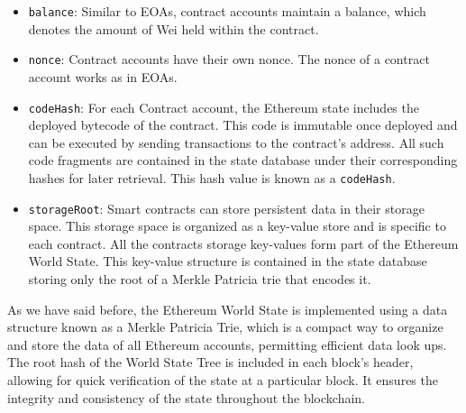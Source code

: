 \begin{itemize}

\item \texttt{balance}: Similar to EOAs, contract accounts maintain a balance, which denotes the amount of Wei held within the contract.

\item \texttt{nonce}: Contract accounts have their own nonce. The nonce of a contract account works as in EOAs.

\item \texttt{codeHash}: For each Contract account, the Ethereum state includes the deployed bytecode of the contract. This code is immutable once deployed and can be executed by sending transactions to the contract's address. All such code fragments are contained in the state database under their corresponding hashes for later retrieval. This hash value is known as a \texttt{codeHash}.

\item \texttt{storageRoot}: Smart contracts can store persistent data in their storage space. This storage space is organized as a key-value store and is specific to each contract. All the contracts storage key-values form part of the Ethereum World State. This key-value structure is contained in the state database storing only the root of a Merkle Patricia trie that encodes it.
\end{itemize}

As we have said before, the Ethereum World State is implemented using a data structure known as a Merkle Patricia Trie, which is a compact way to organize and store the data of all Ethereum accounts, permitting efficient data look ups. The root hash of the World State Tree is included in each block's header, allowing for quick verification of the state at a particular block. It ensures the integrity and consistency of the state throughout the blockchain.


